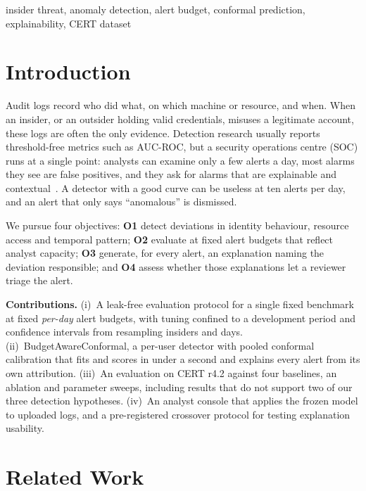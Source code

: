 \documentclass[conference]{IEEEtran}
\begin{document}
\begin{IEEEkeywords}
insider threat, anomaly detection, alert budget, conformal prediction, explainability, CERT dataset
\end{IEEEkeywords}

\section{Introduction}
Audit logs record who did what, on which machine or resource, and when. When an insider, or an
outsider holding valid credentials, misuses a legitimate account, these logs are often the only
evidence. Detection research usually reports threshold-free metrics such as AUC-ROC, but a
security operations centre (SOC) runs at a single point: analysts can examine only a few alerts a
day, most alarms they see are false positives, and they ask for alarms that are explainable and
contextual~\cite{alahmadi2022false}. A detector with a good curve can be useless at ten alerts per
day, and an alert that only says ``anomalous'' is dismissed.

We pursue four objectives: \textbf{O1} detect deviations in identity behaviour, resource access
and temporal pattern; \textbf{O2} evaluate at fixed alert budgets that reflect analyst capacity;
\textbf{O3} generate, for every alert, an explanation naming the deviation responsible; and
\textbf{O4} assess whether those explanations let a reviewer triage the alert.

\textbf{Contributions.} (i)~A leak-free evaluation protocol for a single fixed benchmark at fixed
\emph{per-day} alert budgets, with tuning confined to a development period and confidence intervals
from resampling insiders and days. (ii)~BudgetAwareConformal, a per-user detector with pooled
conformal calibration that fits and scores in under a second and explains every alert from its own
attribution. (iii)~An evaluation on CERT r4.2 against four baselines, an ablation and parameter
sweeps, including results that do not support two of our three detection hypotheses. (iv)~An
analyst console that applies the frozen model to uploaded logs, and a pre-registered crossover
protocol for testing explanation usability.

\section{Related Work}

\end{document}
